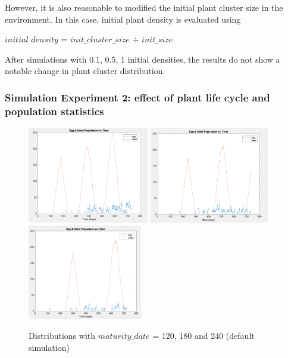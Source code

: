 \documentclass[3p,,preprint,12pt]{elsarticle}
\begin{document}
However, it is also reasonable to modified the initial plant cluster size in the environment. In this case, initial plant density is evaluated using 
        \begin{center}
        $initial$ $density$ = $init\_cluster\_size$ $\div$ $init\_size$
        \end{center}
After simulations with 0.1, 0.5, 1 initial densities, the results do not show a notable change in plant cluster distribution. 
    
\subsubsection{Simulation Experiment 2: effect of plant life cycle and population statistics}
    \begin{figure}[!htb]
    \begin{center}
    \includegraphics[width=53mm]{figures/s2_3.png} 
    \includegraphics[width=52mm]{figures/s2_1.png} 
    \includegraphics[width=50mm]{figures/s2_2.png} 
    \caption{Distributions with $maturity\_date$ = 120, 180 and 240 (default simulation)}
    \end{center}
    \end{figure}
    
\end{document}
